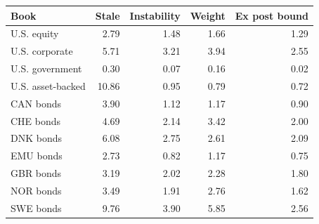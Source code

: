 \begin{tabular}{lrrrr}
\toprule
Book & Stale & Instability & Weight & Ex post bound \\
\midrule
U.S. equity & 2.79 & 1.48 & 1.66 & 1.29 \\
U.S. corporate & 5.71 & 3.21 & 3.94 & 2.55 \\
U.S. government & 0.30 & 0.07 & 0.16 & 0.02 \\
U.S. asset-backed & 10.86 & 0.95 & 0.79 & 0.72 \\
CAN bonds & 3.90 & 1.12 & 1.17 & 0.90 \\
CHE bonds & 4.69 & 2.14 & 3.42 & 2.00 \\
DNK bonds & 6.08 & 2.75 & 2.61 & 2.09 \\
EMU bonds & 2.73 & 0.82 & 1.17 & 0.75 \\
GBR bonds & 3.19 & 2.02 & 2.28 & 1.80 \\
NOR bonds & 3.49 & 1.91 & 2.76 & 1.62 \\
SWE bonds & 9.76 & 3.90 & 5.85 & 2.56 \\
\bottomrule
\end{tabular}
